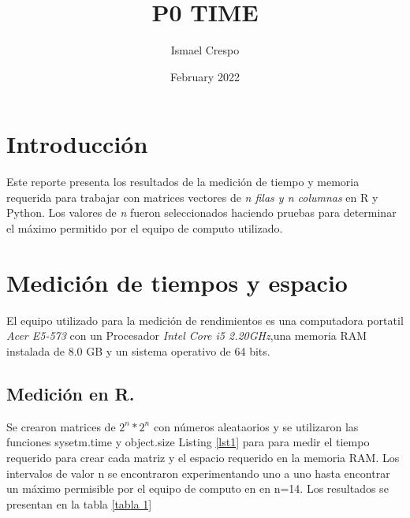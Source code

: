 \documentclass{article}
\title{P0 TIME}
\author{Ismael Crespo}
\date{February 2022}
\begin{document}
\maketitle

\section{Introducción}
Este reporte presenta los resultados de la medición de tiempo y memoria requerida para trabajar con matrices vectores de \emph{n filas y n columnas} en R y Python. Los valores de \emph{n} fueron seleccionados haciendo pruebas para determinar el máximo permitido por el equipo de computo utilizado. 

\section{Medición de tiempos y espacio }
El equipo utilizado para la medición de rendimientos es una computadora portatil \emph{Acer E5-573 } con un Procesador \emph{Intel Core i5 2.20GHz},una memoria RAM instalada de 8.0 GB y un sistema operativo de 64 bits.
\subsection{Medición en R.} 
Se crearon matrices de $2^n * 2^n$ con números aleataorios y se utilizaron las funciones sysetm.time y object.size Listing \ref{lst1} para para medir el tiempo requerido para crear cada matriz y el espacio requerido en la memoria RAM. Los intervalos de valor n se encontraron experimentando uno a uno hasta encontrar un máximo permisible por el equipo de computo en en n=14. Los resultados se presentan en la tabla \ref{tabla 1}
\end{document}
